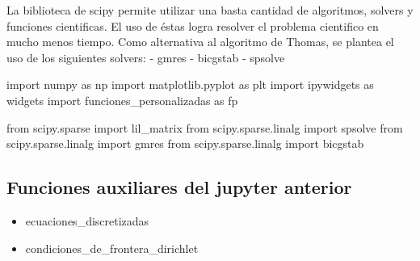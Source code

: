 \documentclass[
  letterpaper,
  DIV=11,
  numbers=noendperiod]{scrreprt}
\newenvironment{Shaded}{\begin{snugshade}}{\end{snugshade}}
\newcommand{\ImportTok}[1]{\textcolor[rgb]{0.00,0.46,0.62}{#1}}
\newcommand{\NormalTok}[1]{\textcolor[rgb]{0.00,0.23,0.31}{#1}}
\providecommand{\tightlist}{%
  \setlength{\itemsep}{0pt}\setlength{\parskip}{0pt}}\usepackage{longtable,booktabs,array}
\begin{document}
La biblioteca de scipy permite utilizar una basta cantidad de
algoritmos, solvers y funciones cientificas. El uso de éstas logra
resolver el problema cientifico en mucho menos tiempo. Como alternativa
al algoritmo de Thomas, se plantea el uso de los siguientes solvers: -
gmres - bicgstab - spsolve

\begin{Shaded}
\begin{Highlighting}[]
\ImportTok{import}\NormalTok{ numpy }\ImportTok{as}\NormalTok{ np}
\ImportTok{import}\NormalTok{ matplotlib.pyplot }\ImportTok{as}\NormalTok{ plt}
\ImportTok{import}\NormalTok{ ipywidgets }\ImportTok{as}\NormalTok{ widgets}
\ImportTok{import}\NormalTok{ funciones\_personalizadas }\ImportTok{as}\NormalTok{ fp}

\ImportTok{from}\NormalTok{ scipy.sparse }\ImportTok{import}\NormalTok{ lil\_matrix}
\ImportTok{from}\NormalTok{ scipy.sparse.linalg }\ImportTok{import}\NormalTok{ spsolve}
\ImportTok{from}\NormalTok{ scipy.sparse.linalg }\ImportTok{import}\NormalTok{ gmres}
\ImportTok{from}\NormalTok{ scipy.sparse.linalg }\ImportTok{import}\NormalTok{ bicgstab}
\end{Highlighting}
\end{Shaded}

\subsection{Funciones auxiliares del jupyter
anterior}\label{funciones-auxiliares-del-jupyter-anterior}

\begin{itemize}
\tightlist
\item
  ecuaciones\_discretizadas
\item
  condiciones\_de\_frontera\_dirichlet
\end{itemize}
\end{document}
